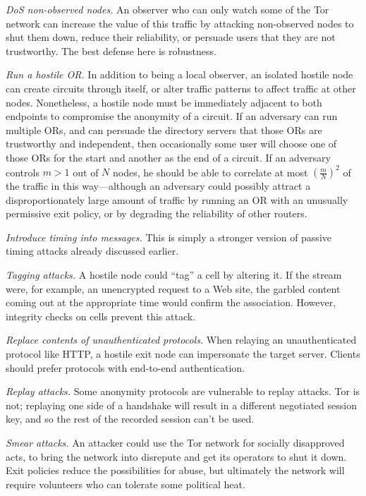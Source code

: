 \documentclass[times,10pt,twocolumn]{article}
\begin{document}
\emph{DoS non-observed nodes.} An observer who can only watch some
of the Tor network can increase the value of this traffic
by attacking non-observed nodes to shut them down, reduce
their reliability, or persuade users that they are not trustworthy.
The best defense here is robustness.

\emph{Run a hostile OR.}  In addition to being a local observer,
an isolated hostile node can create circuits through itself, or alter
traffic patterns to affect traffic at other nodes. Nonetheless, a hostile
node must be immediately adjacent to both endpoints to compromise the
anonymity of a circuit. If an adversary can
run multiple ORs, and can persuade the directory servers
that those ORs are trustworthy and independent, then occasionally
some user will choose one of those ORs for the start and another
as the end of a circuit. If an adversary
controls $m>1$ out of $N$ nodes, he should be able to correlate at most
$\left(\frac{m}{N}\right)^2$ of the traffic in this way---although an
adversary
could possibly attract a disproportionately large amount of traffic
by running an OR with an unusually permissive exit policy, or by
degrading the reliability of other routers.

\emph{Introduce timing into messages.} This is simply a stronger
version of passive timing attacks already discussed earlier.

\emph{Tagging attacks.} A hostile node could ``tag'' a
cell by altering it. If the
stream were, for example, an unencrypted request to a Web site,
the garbled content coming out at the appropriate time would confirm
the association. However, integrity checks on cells prevent
this attack.

\emph{Replace contents of unauthenticated protocols.}  When
relaying an unauthenticated protocol like HTTP, a hostile exit node
can impersonate the target server. Clients
should prefer protocols with end-to-end authentication.

\emph{Replay attacks.} Some anonymity protocols are vulnerable
to replay attacks.  Tor is not; replaying one side of a handshake
will result in a different negotiated session key, and so the rest
of the recorded session can't be used.

\emph{Smear attacks.} An attacker could use the Tor network for
socially disapproved acts, to bring the
network into disrepute and get its operators to shut it down.
Exit policies reduce the possibilities for abuse, but
ultimately the network will require volunteers who can tolerate
some political heat.
\end{document}
